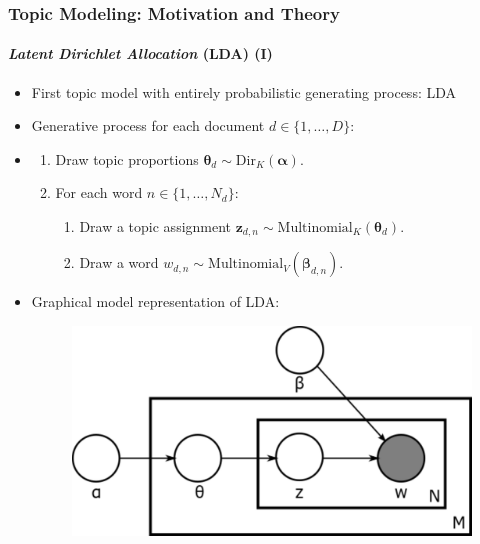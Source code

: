 \documentclass[xcolor=dvipsnames]{beamer}
\begin{document}
\begin{frame}
\frametitle{Topic Modeling: Motivation and Theory}
\framesubtitle{\textit{Latent Dirichlet Allocation} (LDA) (I)}
\begin{itemize}
\item First topic model with entirely probabilistic generating process: LDA \cite{blei2003latent}
\item Generative process for each document $d \in \{1,\dots,D\}$:
\item[] 
	\begin{enumerate}[{1)}]
	\item Draw topic proportions $\boldsymbol{\theta}_d \sim \text{Dir}_K(\boldsymbol{\alpha})$.
	\item For each word $n \in \{1,\dots,N_d\}$:
		\begin{enumerate}[{a)}]
		\item Draw a topic assignment $\boldsymbol{z}_{d,n} \sim \text{Multinomial}_K(\boldsymbol{\theta}_d)$.
		\item Draw a word $w_{d,n} \sim \text{Multinomial}_V(\boldsymbol{\beta}_{d,n})$.
	\end{enumerate}
\end{enumerate}
\item Graphical model representation of LDA: \cite{blei2003latent} 
	\begin{figure}[h!]
  	\centering
  	\hspace*{-1cm}\includegraphics[scale = 0.3]{../plots/presentation/lda_graphical.pdf}
	\end{figure}
\end{itemize}
\end{frame}
\end{document}

